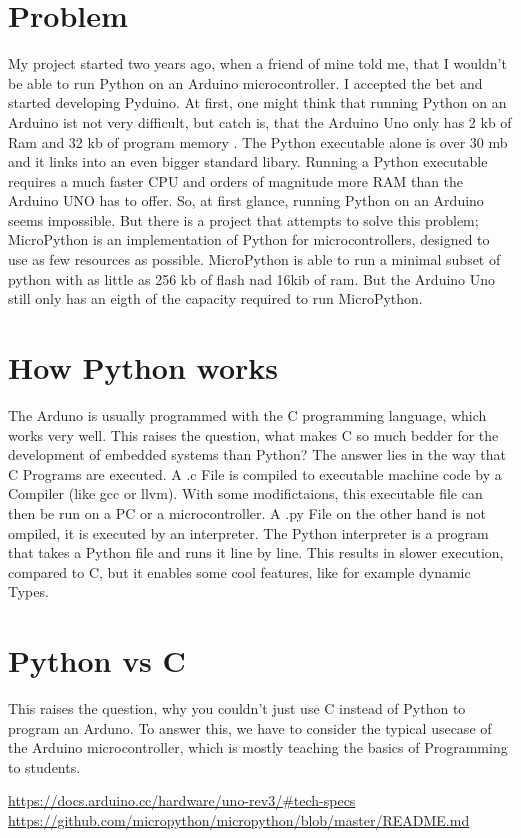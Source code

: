 \documentclass{article}
\begin{document}
\begin{multicols}{2}

\section{Problem}
My project started two years ago, when a friend of mine told me, that I wouldn't be able to run Python on an Arduino microcontroller. I accepted the bet and started developing Pyduino. At first, one might think that running Python on an Arduino ist not very difficult, but catch is, that the Arduino Uno only has 2 kb of Ram and 32 kb of program memory \cite{Q1}. The Python executable alone is over 30 mb and it links into an even bigger standard libary. Running a Python executable requires a much faster CPU and orders of magnitude more RAM than the Arduino UNO has to offer. So, at first glance, running Python on an Arduino seems impossible. But there is a project that attempts to solve this problem; MicroPython is an implementation of Python for microcontrollers, designed to use as few resources as possible. MicroPython is able to run a minimal subset of python with as little as 256 kb of flash nad 16kib of ram. But the Arduino Uno still only has an eigth of the capacity required to run MicroPython.
\section{How Python works}
The Arduno is usually programmed with the C programming language, which works very well. This raises the question, what makes C so much bedder for the development of embedded systems than Python? The answer lies in the way that C Programs are executed. A .c File is compiled to executable machine code by a Compiler (like gcc or llvm). With some modifictaions, this executable file can then be run on a PC or a microcontroller. A .py File on the other hand is not ompiled, it is executed by an interpreter. The Python interpreter is a program that takes a Python file and runs it line by line. This results in slower execution, compared to C, but it enables some cool features, like for example dynamic Types.
\section{Python vs C}
This raises the question, why you couldn't just use C instead of Python to program an Arduno. To answer this, we have to consider the typical usecase of the Arduino microcontroller, which is mostly teaching the basics of Programming to students.



\begin{thebibliography}{99}
\url{https://docs.arduino.cc/hardware/uno-rev3/#tech-specs}
\url{https://github.com/micropython/micropython/blob/master/README.md}
\end{thebibliography}
\end{multicols}
\end{document}
